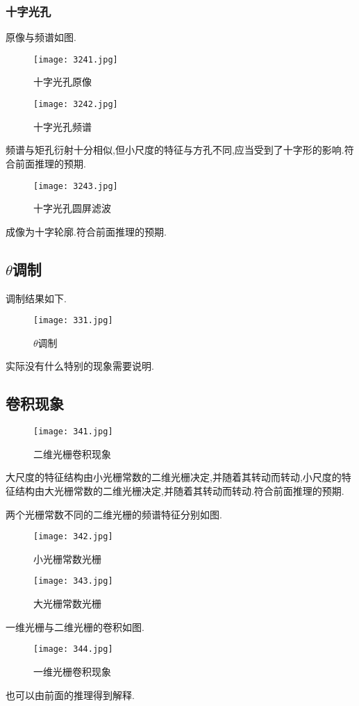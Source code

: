 \documentclass[10pt]{ctexart}
\begin{document}
\subsubsection{十字光孔}
原像与频谱如图.
\begin{figure}[H]
\begin{minipage}[t]{0.5\linewidth}
\centering
\texttt{[image: 3241.jpg]}
\caption{十字光孔原像}
\end{minipage}
\hfill
\begin{minipage}[t]{0.5\linewidth}
\centering
\texttt{[image: 3242.jpg]}
\caption{十字光孔频谱}
\end{minipage}
\end{figure}
频谱与矩孔衍射十分相似,但小尺度的特征与方孔不同,应当受到了十字形的影响.符合前面推理的预期.
\begin{figure}[H]
\centering
\texttt{[image: 3243.jpg]}
\caption{十字光孔圆屏滤波}
\end{figure}
成像为十字轮廓.符合前面推理的预期.
\subsection{$\theta$调制}
调制结果如下.
\begin{figure}[H]
\centering
\texttt{[image: 331.jpg]}
\caption{$\theta$调制}
\end{figure}
实际没有什么特别的现象需要说明.
\subsection{卷积现象}
\begin{figure}[H]
\centering
\texttt{[image: 341.jpg]}
\caption{二维光栅卷积现象}
\end{figure}
大尺度的特征结构由小光栅常数的二维光栅决定,并随着其转动而转动,小尺度的特征结构由大光栅常数的二维光栅决定,并随着其转动而转动.符合前面推理的预期.

两个光栅常数不同的二维光栅的频谱特征分别如图.
\begin{figure}[H]
\begin{minipage}[t]{0.4\linewidth}
\centering
\texttt{[image: 342.jpg]}
\caption{小光栅常数光栅}
\end{minipage}
\hfill
\begin{minipage}[t]{0.4\linewidth}
\centering
\texttt{[image: 343.jpg]}
\caption{大光栅常数光栅}
\end{minipage}
\end{figure}
一维光栅与二维光栅的卷积如图.
\begin{figure}[H]
\centering
\texttt{[image: 344.jpg]}
\caption{一维光栅卷积现象}
\end{figure}
也可以由前面的推理得到解释.
\end{document}
